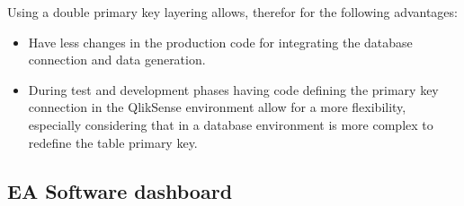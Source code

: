 \documentclass[../main.tex]{subfiles}
\begin{document}
Using a double primary key layering allows, therefor for the following advantages:
\begin{itemize}
\item Have less changes in the production code for integrating the database connection and data generation.
\item During test and development phases having code defining the primary key connection in the QlikSense environment allow for a more flexibility, especially considering that in a database environment is more complex to redefine the table primary key. 
\end{itemize}
\subsection{EA Software dashboard}
\cleardoublepage
\end{document}

